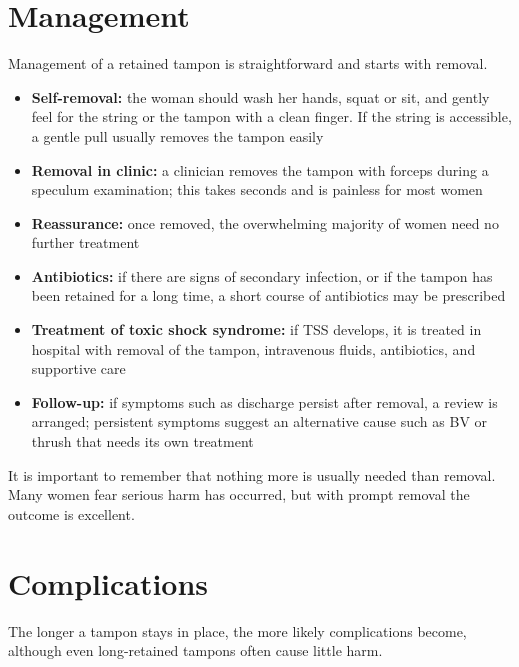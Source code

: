 \section*{Management}
Management of a retained tampon is straightforward and starts with removal.

\begin{itemize}
    \item \textbf{Self-removal:} the woman should wash her hands, squat or sit, and gently feel for the string or the tampon with a clean finger. If the string is accessible, a gentle pull usually removes the tampon easily
    \item \textbf{Removal in clinic:} a clinician removes the tampon with forceps during a speculum examination; this takes seconds and is painless for most women
    \item \textbf{Reassurance:} once removed, the overwhelming majority of women need no further treatment
    \item \textbf{Antibiotics:} if there are signs of secondary infection, or if the tampon has been retained for a long time, a short course of antibiotics may be prescribed
    \item \textbf{Treatment of toxic shock syndrome:} if TSS develops, it is treated in hospital with removal of the tampon, intravenous fluids, antibiotics, and supportive care
    \item \textbf{Follow-up:} if symptoms such as discharge persist after removal, a review is arranged; persistent symptoms suggest an alternative cause such as BV or thrush that needs its own treatment
\end{itemize}

It is important to remember that nothing more is usually needed than removal. Many women fear serious harm has occurred, but with prompt removal the outcome is excellent.

\section*{Complications}
The longer a tampon stays in place, the more likely complications become, although even long-retained tampons often cause little harm.

